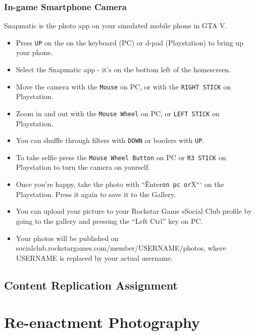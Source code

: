 \documentclass[
  openany]{book}
\begin{document}
\hypertarget{in-game-smartphone-camera}{%
\subsection*{In-game Smartphone Camera}\label{in-game-smartphone-camera}}

Snapmatic is the photo app on your simulated mobile phone in GTA V.

\begin{itemize}
\item
  Press \texttt{UP} on the on the keyboard (PC) or d-pad (Playstation) to bring up your phone.
\item
  Select the Snapmatic app - it's on the bottom left of the homescreen.
\item
  Move the camera with the \texttt{Mouse} on PC, or with the \texttt{RIGHT\ STICK} on Playstation.
\item
  Zoom in and out with the \texttt{Mouse\ Wheel} on PC, or \texttt{LEFT\ STICK} on Playstation.
\item
  You can shuffle through filters with \texttt{DOWN} or borders with \texttt{UP}.
\item
  To take selfie press the \texttt{Mouse\ Wheel\ Button} on PC or \texttt{R3\ STICK} on Playstation to turn the camera on yourself.
\item
  Once you're happy, take the photo with ``Ènter\texttt{on\ pc\ or}X``` on the Playstation. Press it again to save it to the Gallery.
\item
  You can upload your picture to your Rockstar Game sSocial Club profile by going to the gallery and pressing the ``Left Ctrl'' key on PC.
\item
  Your photos will be published on socialclub.rockstargames.com/member/USERNAME/photos, where USERNAME is replaced by your actual username.
\end{itemize}

\hypertarget{content-replication-assignment-1}{%
\section*{Content Replication Assignment}\label{content-replication-assignment-1}}

\hypertarget{re-enactment-photography}{%
\chapter{Re-enactment Photography}\label{re-enactment-photography}}
\end{document}
